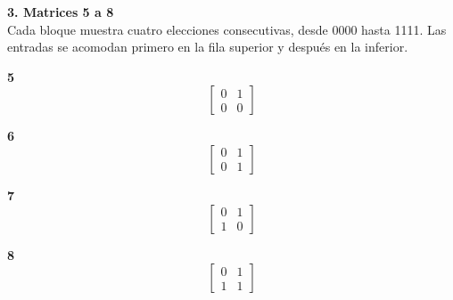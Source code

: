 \documentclass[11pt,a4paper,landscape]{article}
\begin{document}
\noindent\begin{minipage}{\linewidth}\textbf{3. Matrices 5 a 8}\\[2pt]Cada bloque muestra cuatro elecciones consecutivas, desde 0000 hasta 1111. Las entradas se acomodan primero en la fila superior y después en la inferior.
\par\smallskip \begin{minipage}[t]{.47\linewidth}\centering \textbf{5}\[\begin{bmatrix}0 & 1\\0 & 0\end{bmatrix}\]\end{minipage}\hfill\begin{minipage}[t]{.47\linewidth}\centering \textbf{6}\[\begin{bmatrix}0 & 1\\0 & 1\end{bmatrix}\]\end{minipage}\par\smallskip
\par\smallskip \begin{minipage}[t]{.47\linewidth}\centering \textbf{7}\[\begin{bmatrix}0 & 1\\1 & 0\end{bmatrix}\]\end{minipage}\hfill\begin{minipage}[t]{.47\linewidth}\centering \textbf{8}\[\begin{bmatrix}0 & 1\\1 & 1\end{bmatrix}\]\end{minipage}\par\smallskip
\end{minipage}\par\medskip
\end{document}
